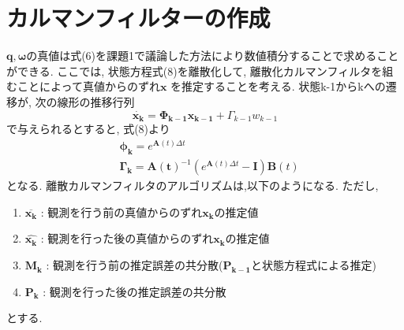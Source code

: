 \documentclass[dvipdfmx, fleqn, uplatex, a4paper]{jsarticle}
\begin{document}
\section{カルマンフィルターの作成}
$\bm{q},\bm{\omega}$の真値は式(6)を課題1で議論した方法により数値積分することで求めることができる.
ここでは, 状態方程式(8)を離散化して, 離散化カルマンフィルタを組むことによって真値からのずれ$\bm{x}$
を推定することを考える.
状態k-1からkへの遷移が, 次の線形の推移行列
\begin{equation}
  \dot{\bm{x_k}} = \bm{\Phi_{k-1}}\bm{x_{k-1}} + \Gamma_{k-1}w_{k-1}
\end{equation}
で与えられるとすると, 式(8)より
\begin{align}
  & \bm{\phi_{k}} = e^{\bm{A}(t)\Delta t} \\
  & \bm{\Gamma_{k}} = \bm{A(t)}^{-1}(e^{\bm{A}(t)\Delta t} - \bm{I})\bm{B}(t)
\end{align}
となる. 離散カルマンフィルタのアルゴリズムは,以下のようになる.
ただし,
\begin{enumerate}
  \item $\overline{\bm{x_k}}$ : 観測を行う前の真値からのずれ$\bm{x_k}$の推定値
  \item $\hat{\bm{x_k}}$ : 観測を行った後の真値からのずれ$\bm{x_k}$の推定値
  \item $\bm{M_k}$ : 観測を行う前の推定誤差の共分散($\bm{P_{k-1}}$と状態方程式による推定)
  \item $\bm{P_k}$ : 観測を行った後の推定誤差の共分散
\end{enumerate}
とする.
\end{document}
